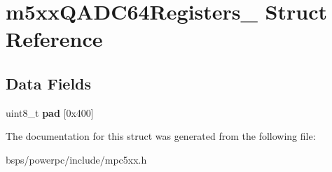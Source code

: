 \hypertarget{structm5xxQADC64Registers__}{}\section{m5xx\+Q\+A\+D\+C64\+Registers\+\_\+ Struct Reference}
\label{structm5xxQADC64Registers__}
\subsection*{Data Fields}
\begin{DoxyCompactItemize}
\item 
\mbox{\label{structm5xxQADC64Registers___a4d1c28614e77ca5b7ba893586eb0d120}} 
uint8\+\_\+t {\bfseries pad} \mbox{[}0x400\mbox{]}
\end{DoxyCompactItemize}


The documentation for this struct was generated from the following file\+:\begin{DoxyCompactItemize}
\item 
bsps/powerpc/include/mpc5xx.\+h\end{DoxyCompactItemize}
